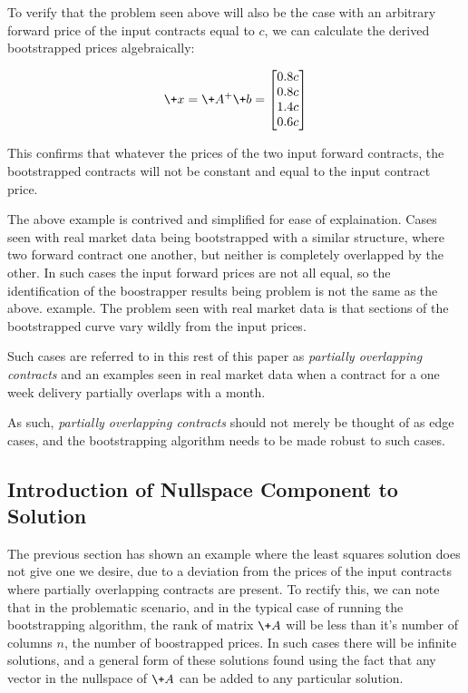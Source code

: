 \documentclass{article}
\begin{document}
To verify that the problem seen above will also be the case with an arbitrary forward
price of the input contracts equal to $c$, we can calculate the derived bootstrapped 
prices algebraically:

\begin{equation}
    \+x = \+A^+ \+b = \begin{bmatrix}
            0.8c \\
            0.8c \\
            1.4c \\
            0.6c \\
        \end{bmatrix}
\end{equation}

This confirms that whatever the prices of the two input forward contracts, the bootstrapped
contracts will not be constant and equal to the input contract price.

\bigskip

The above example is contrived and simplified for ease of explaination.
Cases seen with real market data being bootstrapped with a similar structure, where
two forward contract one another, but neither is completely overlapped by the other.
In such cases the input forward prices are not all equal, so the identification
of the boostrapper results being problem is not the same as the above.
example. The problem seen with real market data is that sections of the bootstrapped
curve vary wildly from the input prices.

Such cases are referred to in this rest of this paper as \emph{partially overlapping contracts}
and an examples seen in real market data when a contract for a one week delivery partially
overlaps with a month.

As such, \emph{partially overlapping contracts} should not merely be 
thought of as edge cases, and the bootstrapping algorithm needs to be made robust to
such cases.


\subsection{Introduction of Nullspace Component to Solution}
The previous section has shown an example where the least squares solution does 
not give one we desire, due to a deviation from the prices of the input contracts
where partially overlapping contracts are present.
To rectify this, we can note that in the problematic scenario, and in the typical
case of running the bootstrapping algorithm, the rank of matrix $\+A$ will be
less than it's number of columns $n$, the number of boostrapped prices. In such
cases there will be infinite solutions, and a general form of these solutions found
using the fact that any vector in the nullspace of $\+A$ can be added to any
particular solution.
\end{document}
